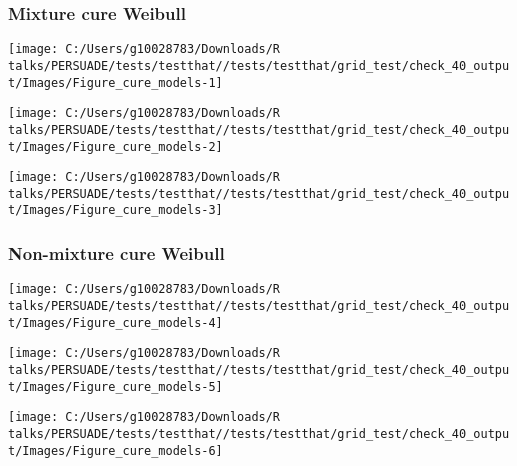 \documentclass[
]{article}
\begin{document}
\clearpage

\clearpage

\subsubsection{Mixture cure Weibull}\label{mixture-cure-weibull}

\begin{flushleft}\texttt{[image: C:/Users/g10028783/Downloads/R talks/PERSUADE/tests/testthat//tests/testthat/grid\_test/check\_40\_output/Images/Figure\_cure\_models-1]} \end{flushleft}

\begin{flushleft}\texttt{[image: C:/Users/g10028783/Downloads/R talks/PERSUADE/tests/testthat//tests/testthat/grid\_test/check\_40\_output/Images/Figure\_cure\_models-2]} \end{flushleft}

\begin{flushleft}\texttt{[image: C:/Users/g10028783/Downloads/R talks/PERSUADE/tests/testthat//tests/testthat/grid\_test/check\_40\_output/Images/Figure\_cure\_models-3]} \end{flushleft}

\clearpage

\subsubsection{Non-mixture cure Weibull}\label{non-mixture-cure-weibull}

\begin{flushleft}\texttt{[image: C:/Users/g10028783/Downloads/R talks/PERSUADE/tests/testthat//tests/testthat/grid\_test/check\_40\_output/Images/Figure\_cure\_models-4]} \end{flushleft}

\begin{flushleft}\texttt{[image: C:/Users/g10028783/Downloads/R talks/PERSUADE/tests/testthat//tests/testthat/grid\_test/check\_40\_output/Images/Figure\_cure\_models-5]} \end{flushleft}

\begin{flushleft}\texttt{[image: C:/Users/g10028783/Downloads/R talks/PERSUADE/tests/testthat//tests/testthat/grid\_test/check\_40\_output/Images/Figure\_cure\_models-6]} \end{flushleft}
\end{document}

